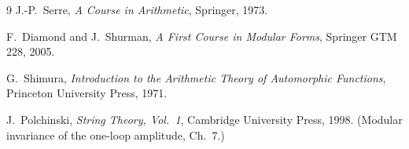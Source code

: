 \documentclass[12pt,a4paper]{article}
\theoremstyle{definition}
\theoremstyle{remark}
\begin{document}
\begin{thebibliography}{9}
J.-P.\ Serre, \textit{A Course in Arithmetic}, Springer, 1973.

F.\ Diamond and J.\ Shurman, \textit{A First Course in Modular Forms},
Springer GTM 228, 2005.

G.\ Shimura, \textit{Introduction to the Arithmetic Theory of Automorphic
Functions}, Princeton University Press, 1971.

J.\ Polchinski, \textit{String Theory, Vol.~1}, Cambridge University
Press, 1998.  (Modular invariance of the one-loop amplitude, Ch.~7.)
\end{thebibliography}
\end{document}
